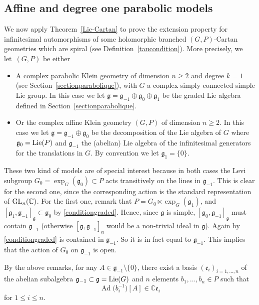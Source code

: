 \documentclass[10pt,a4paper]{amsart}
\numberwithin{equation}{section}
\begin{document}
\subsection{Affine and degree one parabolic models}
We now apply Theorem~\ref{Lie-Cartan} to prove the extension property for infinitesimal automorphisms of some holomorphic branched $(G,P)$-Cartan geometries which are spiral (see Definition~\ref{taucondition}). More precisely, we let~$(G,P)$ be either
\begin{itemize}\itemsep=0pt
 \item[$\bullet$] A complex parabolic Klein geometry of dimension $n\geq 2$ and degree $k=1$ (see Section~\ref{sectionparabolique}), with $G$ a complex simply connected simple Lie group. In this case we let $\mathfrak{g}=\mathfrak{g}_{-1}\oplus \mathfrak{g}_0\oplus \mathfrak{g}_1$ be the graded Lie algebra defined in Section~\ref{sectionparabolique}.
\item[$\bullet$] Or the complex affine Klein geometry $(G,P)$ of dimension $n\geq 2$. In this case we let $\mathfrak{g}=\mathfrak{g}_{-1}\oplus \mathfrak{g}_0$ be the decomposition of the Lie algebra of $G$ where $\mathfrak{g}_0={\rm Lie}(P)$ and $\mathfrak{g}_{-1}$ the (abelian) Lie algebra of the infinitesimal generators for the translations in $G$. By convention we let $\mathfrak{g}_{1}=\{0\}$. \end{itemize}

These two kind of models are of special interest because in both cases the Levi subgroup $G_0=\exp _{G}(\mathfrak{g}_0)\subset P$ acts transitively on the lines in $\mathfrak{g}_{-1}$. This is clear for the second one, since the corresponding action is the standard representation of ${\rm GL}_n(\mathbb{C})$. For the first one, remark that $P=G_0 \ltimes \exp _G(\mathfrak{g}_1)$, and $[\mathfrak{g}_1,\mathfrak{g}_{-1}]_\mathfrak{g} \subset \mathfrak{g}_0$ by \eqref{conditiongraded}. Hence, since $\mathfrak{g}$ is simple, $[\mathfrak{g}_0,\mathfrak{g}_{-1}]_\mathfrak{g}$ must contain $\mathfrak{g}_{-1}$ (otherwise $[\mathfrak{g},\mathfrak{g}_{-1}]_{\mathfrak{g}}$ would be a non-trivial ideal in $\mathfrak{g}$). Again by \eqref{conditiongraded} is contained in $\mathfrak{g}_{-1}$. So it is in fact equal to $\mathfrak{g}_{-1}$. This implies that the action of $G_0$ on $\mathfrak{g}_{-1}$ is open.


By the above remarks, for any $A\in \mathfrak{g}_{-1}\setminus \{0\}$, there exist a basis $(\mathfrak{e}_i)_{i=1,\dots,n}$ of the abelian subalgebra $\mathfrak{g}_{-1}\subset \mathfrak{g}={\rm Lie}(G)$ and $n$ elements $b_1,\dots,b_n \in P$ such that{\samepage \begin{equation}\label{pi} \operatorname{Ad}\big(b_i^{-1}\big)[A]\in \mathbb{C} \mathfrak{e}_i \end{equation} for $1\leq i\leq n$.}
\end{document}
